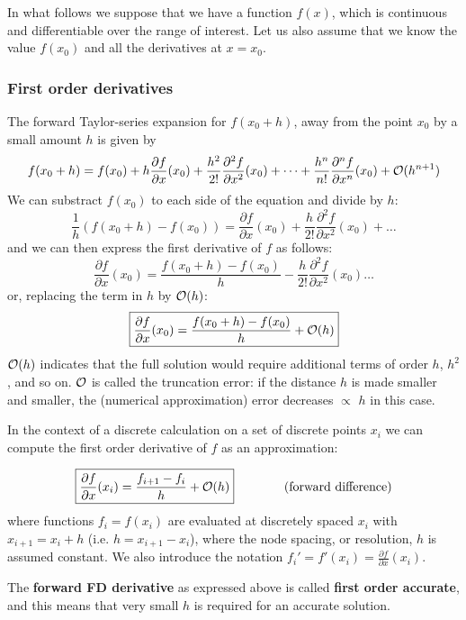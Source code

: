 In what follows we suppose that we have a function $f(x)$, 
which is continuous and differentiable over the range of interest. 
Let us also assume that we know the value $f(x_0)$ and all the derivatives at $x = x_0$. 

\subsubsection{First order derivatives}

The forward Taylor-series expansion for $f(x_0 + h)$, away 
from the point $x_0$ by a small amount $h$ is given by
\[
f(x_0+h)=f(x_0)+ 
h \frac{\partial f}{\partial x}(x_0)  + 
\frac{h^2}{2!} \frac{\partial^2 f}{\partial x^2}(x_0)  +
\dots  +
\frac{h^n}{n!} \frac{\partial^n f}{\partial x^n}(x_0)  
+ {\cal O}(h^{n+1})
\]
We can substract $f(x_0)$ to each side of the equation and divide by $h$:
\[
\frac{1}{h} (f(x_0+h)-f(x_0)) = 
 \frac{\partial f}{\partial x}(x_0)  + 
\frac{h}{2!} \frac{\partial^2 f}{\partial x^2}(x_0)  + \dots 
\]
and we can then express the first derivative of $f$ as follows:
\[
\frac{\partial f}{\partial x}(x_0) = \frac{f(x_0+h)-f(x_0)}{h} - 
\frac{h}{2!} \frac{\partial^2 f}{\partial x^2}(x_0)  \dots
\]
or, replacing the term in $h$ by ${\cal O}(h)$:
\[
\boxed{
\frac{\partial f}{\partial x}(x_0) = \frac{f(x_0+h)-f(x_0)}{h} + {\cal O}(h)
}
\]
${\cal O}(h)$ indicates that the full solution would require additional terms of order $h$, $h^2$, 
and so on. ${\cal O}$ is called the {\color{olive}truncation error}: if the distance $h$ 
is made smaller and smaller, the (numerical approximation) error decreases $\propto$ $h$ in this case.

\begin{center}

\end{center}


In the context of a discrete calculation on a set of discrete points $x_i$
we can compute the first order derivative of $f$ as an approximation:


\[
\boxed{
\frac{\partial f}{\partial x}(x_i) = \frac{f_{i+1}-f_i}{h} + {\cal O}(h) 
}
\qquad
\qquad
\text{(forward difference)} 
\]
where functions $f_i = f (x_i)$ are evaluated at discretely spaced $x_i$ with $x_{i+1} = x_i + h$ 
(i.e. $h=x_{i+1}-x_i$), where the node spacing, or resolution, $h$ is assumed constant.
We also introduce the notation $f_i'=f'(x_i)=\frac{\partial f}{\partial x} (x_i)$. 


The {\bf forward FD derivative} as expressed above is called {\bf first order accurate},
and this means that very small $h$ is required for an accurate solution.

